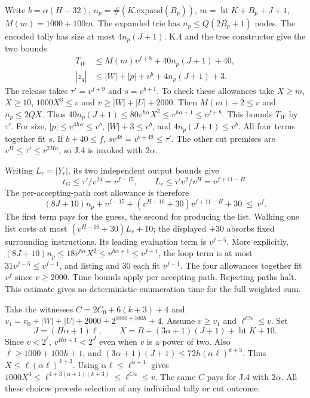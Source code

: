 \clearpage
{}
Write $b=\alpha(H-32)$, $n_p=\#(K.\mathrm{expand}(B_p))$, $m=\operatorname{ht}K+B_p+J+1$, $M(m)=1000+100m$. The expanded trie has $n_p\le Q(2B_p+1)$ nodes. The encoded tally has size at most $4n_p(J+1)$. K.4 and the tree constructor give the two bounds
\[
 \begin{aligned}
 T_{W}&\le M(m)v^{f+8}+40n_p(J+1)+40,\\
 |z_q|&\le |W|+|p|+v^b+4n_p(J+1)+3 .
 \end{aligned}
\]
The release takes $\tau'=v^{f+9}$ and $s=v^{b+1}$. To check these allowances take $X\ge m$, $X\ge10$, $1000X^3\le v$ and $v\ge|W|+|U|+2000$. Then $M(m)+2\le v$ and $n_p\le2QX$. Thus $40n_p(J+1)\le 80v^{h\alpha}X^2\le v^{h\alpha+1}\le v^{f+8}$. This bounds $T_W$ by $\tau'$. For size, $|p|\le v^{4h\alpha}\le v^b$, $|W|+3\le v^b$, and $4n_p(J+1)\le v^b$. All four terms together fit $s$. If $b+40\le f$, $s v^{48}=v^{b+49}\le\tau'$. The other cut premises are $v^H\le\tau'\le v^{2H\alpha}$, so J.4 is invoked with $2\alpha$.

Writing $L_r=|Y_r|$, its two independent output bounds give
\[
 t_G\le \tau'/v^{24}=v^{f-15},\qquad
 L_r\le \tau'v^2/v^H=v^{f+11-H}.
\]
The per-accepting-path cost allowance is therefore
\[
 (8J+10)n_p + v^{f-15}
   +(v^{H-16}+30)v^{f+11-H}+30\ \le\ v^f.
\]
The first term pays for the guess, the second for producing the list. Walking one list costs at most $(v^{H-16}+30)L_r+10$; the displayed $+30$ absorbs fixed surrounding instructions. Its leading evaluation term is $v^{f-5}$. More explicitly, $(8J+10)n_p\le 18v^{h\alpha}X^2\le v^{h\alpha+1}\le v^{f-1}$, the loop term is at most $31v^{f-5}\le v^{f-1}$, and listing and $30$ each fit $v^{f-1}$. The four allowances together fit $v^f$ since $v\ge2000$. Time bounds apply per accepting path. Rejecting paths halt. This estimate gives no deterministic enumeration time for the full weighted sum.

\clearpage
{}
Take the witnesses $C=2C_0+6(k+3)+4$ and $v_1=v_0+|W|+|U|+2000+2^{1000+100h}+4$. Assume $v\ge v_1$ and $\ell^{C\alpha}\le v$. Set
\[
 J=(H\alpha+1)\ell,\qquad X=B+(3\alpha+1)(J+1)+\operatorname{ht}K+10 .
\]
Since $v<2^\ell$, $v^{H\alpha+1}<2^J$ even when $v$ is a power of two. Also $\ell\ge1000+100h+1$, and $(3\alpha+1)(J+1)\le72h(\alpha\ell)^{k+3}$. Thus $X\le\ell(\alpha\ell)^{k+3}$. Using $\alpha\ell\le\ell^{\alpha+1}$ gives
$1000X^3\le\ell^{4+3(\alpha+1)(k+3)}\le\ell^{C\alpha}\le v$. The same $C$ pays for J.4 with $2\alpha$. All these choices precede selection of any individual tally or cut outcome.

